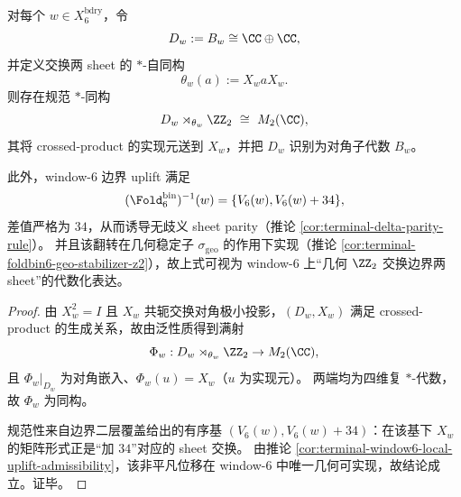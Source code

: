 \begin{theorem}[边界块的 crossed product 刻画与 \texorpdfstring{\(\delta=34\)}{delta=34} 的几何实现]\label{thm:conclusion-window6-boundary-crossed-product-delta34}
对每个 \(w\in X_6^{\mathrm{bdry}}\)，令
\[
D_w:=B_w\cong \CC\oplus\CC,
\]
并定义交换两 sheet 的 \(\ast\)-自同构
\[
\theta_w(a):=X_waX_w.
\]
则存在规范 \(\ast\)-同构
\[
D_w\rtimes_{\theta_w}\ZZ_2\ \cong\ M_2(\CC),
\]
其将 crossed-product 的实现元送到 \(X_w\)，并把 \(D_w\) 识别为对角子代数 \(B_w\)。

此外，window-\(6\) 边界 uplift 满足
\[
(\Fold^{\mathrm{bin}}_6)^{-1}(w)=\{V_6(w),V_6(w)+34\},
\]
差值严格为 \(34\)，从而诱导无歧义 sheet parity（推论 \ref{cor:terminal-delta-parity-rule}）。
并且该翻转在几何稳定子 \(\sigma_{\mathrm{geo}}\) 的作用下实现（推论 \ref{cor:terminal-foldbin6-geo-stabilizer-z2}），故上式可视为 window-\(6\) 上“几何 \(\ZZ_2\) 交换边界两 sheet”的代数化表达。
\end{theorem}
\begin{proof}
由 \(X_w^2=I\) 且 \(X_w\) 共轭交换对角极小投影，\((D_w,X_w)\) 满足 crossed-product 的生成关系，故由泛性质得到满射
\[
\Phi_w:D_w\rtimes_{\theta_w}\ZZ_2\to M_2(\CC),
\]
且 \(\Phi_w|_{D_w}\) 为对角嵌入、\(\Phi_w(u)=X_w\)（\(u\) 为实现元）。
两端均为四维复 \(\ast\)-代数，故 \(\Phi_w\) 为同构。

规范性来自边界二层覆盖给出的有序基 \((V_6(w),V_6(w)+34)\)：在该基下 \(X_w\) 的矩阵形式正是“加 \(34\)”对应的 sheet 交换。
由推论 \ref{cor:terminal-window6-local-uplift-admissibility}，该非平凡位移在 window-\(6\) 中唯一几何可实现，故结论成立。证毕。
\end{proof}

